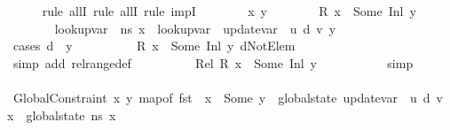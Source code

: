 \begin{isabellebody}
\ \ \ \ \isamarkupfalse%
\ {\isacharparenleft}{\kern0pt}rule\ allI{\isacharcomma}{\kern0pt}\ rule\ allI{\isacharcomma}{\kern0pt}\ rule\ impI{\isacharparenright}{\kern0pt}\isanewline
\ \ \ \ \ \ \isamarkupfalse%
\ x\ y\isanewline
\ \ \ \ \ \ \isamarkupfalse%
\ {\isachardoublequoteopen}R\ x\ {\isacharequal}{\kern0pt}\ Some\ {\isacharparenleft}{\kern0pt}Inl\ y{\isacharparenright}{\kern0pt}{\isachardoublequoteclose}\isanewline
\ \ \ \ \ \ \isamarkupfalse%
\ {\isachardoublequoteopen}lookup{\isacharunderscore}{\kern0pt}var\ {\isasymLambda}\ ns\ x\ {\isacharequal}{\kern0pt}\ lookup{\isacharunderscore}{\kern0pt}var\ {\isasymLambda}{\isacharprime}{\kern0pt}\ {\isacharparenleft}{\kern0pt}update{\isacharunderscore}{\kern0pt}var\ {\isasymLambda}{\isacharprime}{\kern0pt}\ u\ d\ v{\isacharparenright}{\kern0pt}\ y{\isachardoublequoteclose}\isanewline
\ \ \ \ \ \ \ \ \isamarkupfalse%
\ {\isacharparenleft}{\kern0pt}cases\ {\isachardoublequoteopen}d\ {\isacharequal}{\kern0pt}\ y{\isachardoublequoteclose}{\isacharparenright}{\kern0pt}\isanewline
\ \ \ \ \ \ \ \ \isamarkupfalse%
\ {\isacartoucheopen}R\ x\ {\isacharequal}{\kern0pt}\ Some\ {\isacharparenleft}{\kern0pt}Inl\ y{\isacharparenright}{\kern0pt}{\isacartoucheclose}\ dNotElem\isanewline
\ \ \ \ \ \ \ \ \ \isamarkupfalse%
\ {\isacharparenleft}{\kern0pt}simp\ add{\isacharcolon}{\kern0pt}\ rel{\isacharunderscore}{\kern0pt}range{\isacharunderscore}{\kern0pt}def{\isacharparenright}{\kern0pt}\isanewline
\ \ \ \ \ \ \ \ \isamarkupfalse%
\ Rel{}\ {\isacartoucheopen}R\ x\ {\isacharequal}{\kern0pt}\ Some\ {\isacharparenleft}{\kern0pt}Inl\ y{\isacharparenright}{\kern0pt}{\isacartoucheclose}\ \isanewline
\ \ \ \ \ \ \ \ \isamarkupfalse%
\ simp\isanewline
\ \ \ \ \ \ \ \ \isamarkupfalse%
\isanewline
\ \ \ \ \isamarkupfalse%
\ \isanewline
\ \ \ \ \isamarkupfalse%
\ GlobalConstraint{\isacharcolon}{\kern0pt}\ {\isachardoublequoteopen}{\isasymforall}x\ y{\isachardot}{\kern0pt}\ map{\isacharunderscore}{\kern0pt}of\ {\isacharparenleft}{\kern0pt}fst\ {\isasymLambda}{\isacharparenright}{\kern0pt}\ x\ {\isacharequal}{\kern0pt}\ Some\ y\ {\isasymlongrightarrow}\ global{\isacharunderscore}{\kern0pt}state\ {\isacharparenleft}{\kern0pt}update{\isacharunderscore}{\kern0pt}var\ {\isasymLambda}{\isacharprime}{\kern0pt}\ u\ d\ v{\isacharparenright}{\kern0pt}\ x\ {\isacharequal}{\kern0pt}\ global{\isacharunderscore}{\kern0pt}state\ ns\ x{\isachardoublequoteclose}\isanewline

\end{isabellebody}
